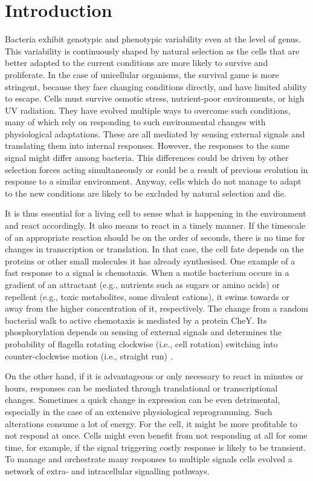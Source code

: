\chapter{Introduction}
\setcounter{page}{1}

\shorthandoff{-}

Bacteria exhibit genotypic and phenotypic variability even at the level of genus.
This variability is continuously shaped by natural selection as the cells that are better adapted to the current conditions are more likely to survive and proliferate.
In the case of unicellular organisms, the survival game is more stringent, because they face changing conditions directly, and have limited ability to escape.
Cells must survive osmotic stress, nutrient-poor environments, or high UV radiation. They have evolved multiple ways to overcome such conditions, many of which rely on responding to such environmental changes with physiological adaptations.
These are all mediated by sensing external signals and translating them into internal responses.
However, the responses to the same signal might differ among bacteria.
This differences could be driven by other selection forces acting simultaneously or could be a result of previous evolution in response to a similar environment.
Anyway, cells which do not manage to adapt to the new conditions are likely to be excluded by natural selection and die.

It is thus essential for a living cell to sense what is happening in the environment and react accordingly.
It also means to react in a timely manner.
If the timescale of an appropriate reaction should be on the order of seconds, there is no time for changes in transcription or translation.
In that case, the cell fate depends on the proteins or other small molecules it has already synthesised.
One example of a fast response to a signal is chemotaxis.
When a motile bacterium occurs in a gradient of an attractant (e.g., nutrients such as sugars or amino acids) or repellent (e.g., toxic metabolites, some divalent cations), it swims towards or away from the higher concentration of it, respectively.
The change from a random bacterial walk to active chemotaxis is mediated by a protein CheY.
Its phosphorylation depends on sensing of external signals and determines the probability of flagella rotating clockwise (i.e., cell rotation) switching into counter-clockwise motion (i.e., straight run) \cite{shimizu2010modular, mears2014escherichia}.

On the other hand, if it is advantageous or only necessary to react in minutes or hours, responses can be mediated through translational or transcriptional changes.
Sometimes a quick change in expression can be even detrimental, especially in the case of an extensive physiological reprogramming.
Such alterations consume a lot of energy.
For the cell, it might be more profitable to not respond at once.
Cells might even benefit from not responding at all for some time, for example, if the signal triggering costly response is likely to be transient.
To manage and orchestrate many responses to multiple signals cells evolved a network of extra- and intracellular signalling pathways.

